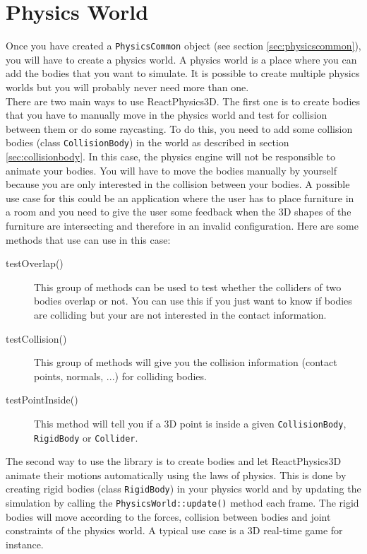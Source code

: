 \documentclass[a4paper,12pt]{article}
\begin{document}
   \section{Physics World}
     \label{sec:physicsworld}

    Once you have created a \texttt{PhysicsCommon} object (see section \ref{sec:physicscommon}), you will have to create a physics world. A physics world is
    a place where you can add the bodies that you want to simulate. It is possible to create multiple physics worlds but you will probably never need more
    than one. \\

    There are two main ways to use ReactPhysics3D. The first one is to create bodies that you have to manually move in the physics world and test for
    collision between them or do some raycasting. To do this, you need to add some collision bodies (class \texttt{CollisionBody}) in the world as
    described in section \ref{sec:collisionbody}. In this case, the physics engine will not be responsible to animate your bodies. You will have to move
    the bodies manually by yourself because you are only interested in the collision between your bodies. A possible use case for this could be an
    application where the user has to place furniture in a room and you need to give the user some feedback when the 3D shapes of the furniture are
    intersecting and therefore in an invalid configuration. Here are some methods that use can use in this case: \\
    
    \begin{description}
       \item[testOverlap()] This group of methods can be used to test whether the colliders of two bodies overlap or not. You can use this if you just want to
	       know if bodies are colliding but your are not interested in the contact information. 
       \item[testCollision()] This group of methods will give you the collision information (contact points, normals, ...) for colliding bodies.
       \item[testPointInside()] This method will tell you if a 3D point is inside a given \texttt{CollisionBody}, \texttt{RigidBody} or \texttt{Collider}. 
    \end{description}

    The second way to use the library is to create bodies and let ReactPhysics3D animate their motions automatically using the laws of physics. This is
    done by creating rigid bodies (class \texttt{RigidBody}) in your physics world and by updating the simulation by calling the 
    \texttt{PhysicsWorld::update()} method each frame. The rigid bodies will move according to the forces, collision between bodies and joint constraints of
    the physics world. A typical use case is a 3D real-time game for instance.
\end{document}
